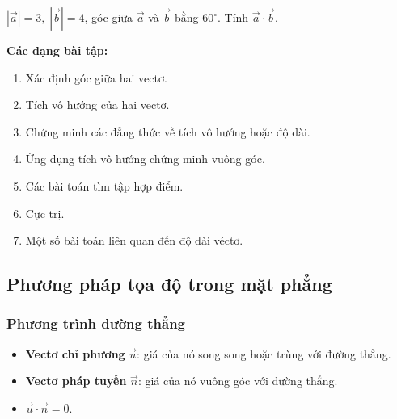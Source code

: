 \documentclass[12pt,a4paper]{article}
\begin{document}
\begin{vidu}
  $|\vec a| = 3,\; |\vec b| = 4$, góc giữa $\vec a$ và $\vec b$ bằng $60^\circ$. Tính $\vec a \cdot \vec b$.
\end{vidu}

\medskip\noindent\textbf{Các dạng bài tập:}
\begin{enumerate}[label=\textbf{Dạng \arabic*:}, leftmargin=*, align=left]
  \item Xác định góc giữa hai vectơ.
  \item Tích vô hướng của hai vectơ.
  \item Chứng minh các đẳng thức về tích vô hướng hoặc độ dài.
  \item Ứng dụng tích vô hướng chứng minh vuông góc.
  \item Các bài toán tìm tập hợp điểm.
  \item Cực trị.
  \item Một số bài toán liên quan đến độ dài véctơ.
\end{enumerate}

\subsection{Phương pháp tọa độ trong mặt phẳng}

\subsubsection{Phương trình đường thẳng}

\begin{dinhnghia}
  \begin{itemize}
    \item \textbf{Vectơ chỉ phương} $\vec u$: giá của nó song song hoặc trùng với đường thẳng.
    \item \textbf{Vectơ pháp tuyến} $\vec n$: giá của nó vuông góc với đường thẳng.
    \item $\vec u \cdot \vec n = 0$.
  \end{itemize}
\end{dinhnghia}
\end{document}
